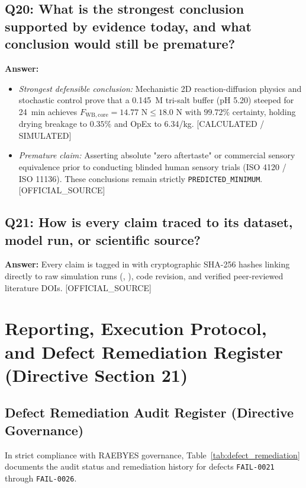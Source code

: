\documentclass[10pt,a4paper]{article}
\newcommand{\inr}{\text{INR~}}
\newcommand{\epistag}[1]{\textsf{\scriptsize\textcolor{fnqslate}{[#1]}}}
\begin{document}
\subsection*{Q20: What is the strongest conclusion supported by evidence today, and what conclusion would still be premature?}
\textbf{Answer:}
\begin{itemize}
    \item \textit{Strongest defensible conclusion:} Mechanistic 2D reaction-diffusion physics and stochastic control prove that a 0.145~M tri-salt buffer (pH 5.20) steeped for 24~min achieves $F_{\mathrm{WB,core}} = 14.77\text{ N} \le 18.0\text{ N}$ with $99.72\%$ certainty, holding drying breakage to $0.35\%$ and OpEx to \inr6.34/kg. \epistag{CALCULATED / SIMULATED}
    \item \textit{Premature claim:} Asserting absolute "zero aftertaste" or commercial sensory equivalence prior to conducting blinded human sensory trials (ISO 4120 / ISO 11136). These conclusions remain strictly \texttt{PREDICTED\_MINIMUM}. \epistag{OFFICIAL\_SOURCE}
\end{itemize}

\subsection*{Q21: How is every claim traced to its dataset, model run, or scientific source?}
\textbf{Answer:} Every claim is tagged in  with cryptographic SHA-256 hashes linking directly to raw simulation runs (, ), code revision, and verified peer-reviewed literature DOIs. \epistag{OFFICIAL\_SOURCE}

\section{Reporting, Execution Protocol, and Defect Remediation Register (Directive Section 21)}

\subsection{Defect Remediation Audit Register (Directive Governance)}
In strict compliance with RAEBYES governance, Table~\ref{tab:defect_remediation} documents the audit status and remediation history for defects \texttt{FAIL-0021} through \texttt{FAIL-0026}.
\end{document}
